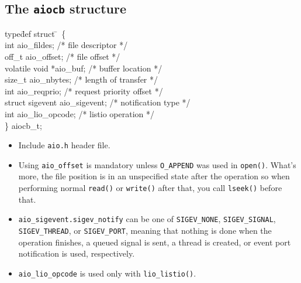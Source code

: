 

\subsection{The \texttt{aiocb} structure}

\begin{tabbing}
type\=def struct \=~\{~~~~~~~~~~~~~~~~~~~\=\\
        \>int			\>aio\_fildes;		\>/* file descriptor */\\
        \>off\_t		\>aio\_offset;		\>/* file offset */\\
        \>volatile void		\>*aio\_buf;		\>/* buffer location */\\
        \>size\_t		\>aio\_nbytes;		\>/* length of transfer */\\
        \>int			\>aio\_reqprio;		\>/* request priority offset */\\
        \>struct sigevent	\>aio\_sigevent;	\>/* notification type */\\
        \>int			\>aio\_lio\_opcode;	\>/* listio operation */\\
\} aiocb\_t;
\end{tabbing}


\begin{itemize}
\item Include \texttt{aio.h} header file.
\item Using \texttt{aio\_offset} is mandatory unless \texttt{O\_APPEND} was used
in \texttt{open()}. What's more, the file position is in an unspecified state
after the operation so when performing normal \texttt{read()} or
\texttt{write()} after that, you  call \texttt{lseek()} before that.
\item \texttt{aio\_sigevent.sigev\_notify} can be one of \texttt{SIGEV\_NONE},
\texttt{SIGEV\_SIGNAL}, \texttt{SIG\-EV\_THREAD}, or \texttt{SIGEV\_PORT}, meaning
that nothing is done when the operation finishes, a queued signal is sent, a
thread is created, or event port notification is used, respectively.
\item \texttt{aio\_lio\_opcode} is used only with \texttt{lio\_listio()}.
\end{itemize}

